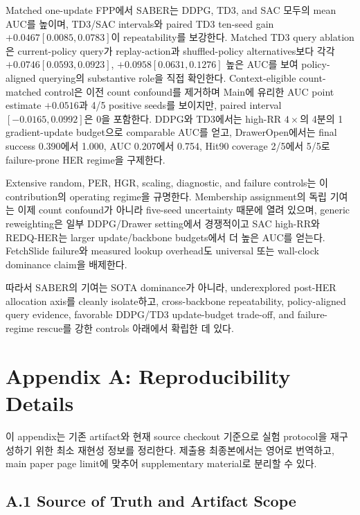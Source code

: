 \documentclass[letterpaper]{article}
\begin{document}
Matched one-update FPP에서 SABER는 DDPG, TD3, and SAC 모두의 mean AUC를 높이며, TD3/SAC intervals와 paired TD3 ten-seed gain \(+0.0467[0.0085,0.0783]\)이 repeatability를 보강한다. Matched TD3 query ablation은 current-policy query가 replay-action과 shuffled-policy alternatives보다 각각 \(+0.0746[0.0593,0.0923]\), \(+0.0958[0.0631,0.1276]\) 높은 AUC를 보여 policy-aligned querying의 substantive role을 직접 확인한다. Context-eligible count-matched control은 이전 count confound를 제거하며 Main에 유리한 AUC point estimate \(+0.0516\)과 4/5 positive seeds를 보이지만, paired interval \([-0.0165,0.0992]\)은 0을 포함한다. DDPG와 TD3에서는 high-RR \(4\times\)의 4분의 1 gradient-update budget으로 comparable AUC를 얻고, DrawerOpen에서는 final success 0.390에서 1.000, AUC 0.207에서 0.754, Hit90 coverage 2/5에서 5/5로 failure-prone HER regime을 구제한다.

Extensive random, PER, HGR, scaling, diagnostic, and failure controls는 이 contribution의 operating regime을 규명한다. Membership assignment의 독립 기여는 이제 count confound가 아니라 five-seed uncertainty 때문에 열려 있으며, generic reweighting은 일부 DDPG/Drawer setting에서 경쟁적이고 SAC high-RR와 REDQ-HER는 larger update/backbone budgets에서 더 높은 AUC를 얻는다. FetchSlide failure와 measured lookup overhead도 universal 또는 wall-clock dominance claim을 배제한다.

따라서 SABER의 기여는 SOTA dominance가 아니라, underexplored post-HER allocation axis를 cleanly isolate하고, cross-backbone repeatability, policy-aligned query evidence, favorable DDPG/TD3 update-budget trade-off, and failure-regime rescue를 강한 controls 아래에서 확립한 데 있다.

\FloatBarrier
\appendix
\raggedbottom
\section{Appendix A: Reproducibility Details}
\label{app:reproducibility}

이 appendix는 기존 artifact와 현재 source checkout 기준으로 실험 protocol을 재구성하기 위한 최소 재현성 정보를 정리한다. 제출용 최종본에서는 영어로 번역하고, main paper page limit에 맞추어 supplementary material로 분리할 수 있다.

\subsection{A.1 Source of Truth and Artifact Scope}
\end{document}
